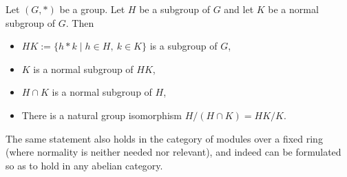 \documentclass[12pt]{article}
\begin{document}
Let $(G,*)$ be a group. Let $H$ be a subgroup of $G$ and let $K$ be a normal subgroup of $G$. Then
\begin{itemize}
\item $HK := \{ h*k \mid h \in H,\ k \in K \}$ is a subgroup of $G$,
\item $K$ is a normal subgroup of $HK$,
\item $H \cap K$ is a normal subgroup of $H$,
\item There is a natural group isomorphism $H/(H \cap K) = HK/K$.
\end{itemize}

The same statement also holds in the category of modules over a fixed ring (where normality is neither needed nor relevant), and indeed can be formulated so as to hold in any abelian category.
\end{document}
